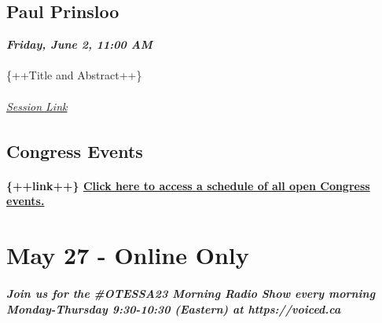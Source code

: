 \documentclass[
]{book}
\begin{document}
\hypertarget{paul-prinsloo}{%
\section*{Paul Prinsloo}\label{paul-prinsloo}}

\textbf{\emph{Friday, June 2, 11:00 AM}}

\begin{keynote}
\hypertarget{section}{%
\subsubsection{}\label{section}}

\{++Title and Abstract++\}

\hypertarget{session-link}{%
\subparagraph{\texorpdfstring{\href{}{Session
Link}}{Session Link}}\label{session-link}}
\end{keynote}

\hypertarget{congress-events}{%
\section*{Congress Events}\label{congress-events}}

\begin{feedback}
\hypertarget{link-click-here-to-access-a-schedule-of-all-open-congress-events.}{%
\subsubsection{\texorpdfstring{\{++link++\} \href{}{Click here to access
a schedule of all open Congress
events.}}{\{++link++\} Click here to access a schedule of all open Congress events.}}\label{link-click-here-to-access-a-schedule-of-all-open-congress-events.}}
\end{feedback}

\hypertarget{may-27---online-only}{%
\chapter{May 27 - Online Only}\label{may-27---online-only}}

\begin{protip}
\hypertarget{join-us-for-the-otessa23-morning-radio-show-every-morning-monday-thursday-930-1030-eastern-at-httpsvoiced.ca}{%
\paragraph{Join us for the \#OTESSA23 Morning Radio Show every morning
Monday-Thursday 9:30-10:30 (Eastern) at
https://voiced.ca}\label{join-us-for-the-otessa23-morning-radio-show-every-morning-monday-thursday-930-1030-eastern-at-httpsvoiced.ca}}
\end{protip}
\end{document}
